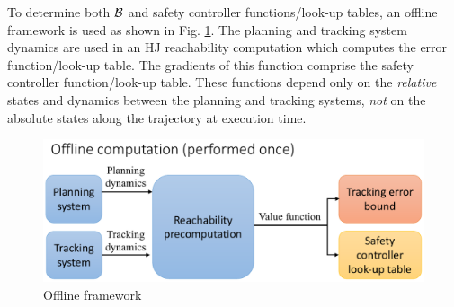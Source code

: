 To determine both $\mathcal B$ and safety controller functions/look-up tables, an offline framework is used as shown in Fig. \ref{fig:fw_offline}. The planning and tracking system dynamics are used in an HJ reachability computation which computes the error function/look-up table. The gradients of this function comprise the safety controller function/look-up table. These functions depend only on the \textit{relative} states and dynamics between the planning and tracking systems, \textit{not} on the absolute states along the trajectory at execution time.

\begin{figure}[]
  \centering
	\includegraphics[width=0.9\columnwidth]{fig/framework_offline}
	\caption{Offline framework}
	\label{fig:fw_offline}
	\vspace{-.1in}
\end{figure}

